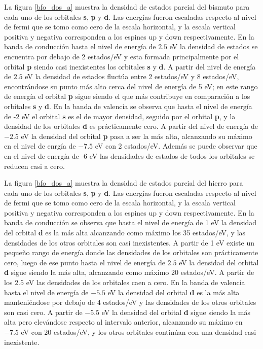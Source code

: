 \noindent La figura \ref{bfo_dos_a}  muestra la densidad de 
estados parcial del 
bismuto 
para cada uno de los orbitales \textbf{s}, \textbf{p} y \textbf{d}. Las 
energ\'ias fueron escaladas respecto al 
nivel de fermi que se tomo como cero de la escala horizontal, y la escala 
vertical positiva y negativa corresponden a los espines up y down 
respectivamente. En la banda 
de conducci\'on hasta el  nivel de energ\'ia de $2.5$ eV la densidad de estados 
se encuentra por debajo de 2 estados/eV y esta formada principalmente 
por el orbital \textbf{p} siendo casi inexistentes los orbitales \textbf{s} y 
\textbf{d}. A partir del nivel de energ\'ia de $2.5$ eV la densidad de estados 
fluct\'ua entre 2 estados/eV y 8 estados/eV, encontr\'andose su punto m\'as 
alto cerca del nivel de energ\'ia de 5 eV; en este rango de energ\'ia el 
orbital \textbf{p} sigue siendo el que m\'as contribuye en comparaci\'on a los 
orbitales \textbf{s} y \textbf{d}. En la banda de valencia se observa que hasta 
el nivel de energ\'ia de -2 eV el orbital \textbf{s} es el de mayor densidad, 
seguido por el orbital \textbf{p}, y la densidad de los orbitales \textbf{d} es 
pr\'acticamente cero. A partir del nivel de energ\'ia de $-2.5$ eV la densidad 
del orbital \textbf{p} pasa a ser la m\'as alta, alcanzando su m\'aximo en el 
nivel de enrg\'ia de $-7.5$ eV con 2 estados/eV. Adem\'as se puede observar que 
en el nivel de energ\'ia de -6 eV las densidades de estados de todos los 
orbitales se reducen casi a cero.


\noindent La figura \ref{bfo_dos_a}  muestra la densidad de 
estados parcial del 
hierro para 
cada uno de los orbitales \textbf{s}, \textbf{p} y \textbf{d}. Las energ\'ias 
fueron escaladas respecto al 
nivel de fermi que se tomo como cero de la escala horizontal, y la escala 
vertical positiva y negativa corresponden a los espines up y down 
respectivamente. En la banda de 
conducci\'on se observa que hasta el nivel de energ\'ia de 1 eV la densidad del 
orbital \textbf{d} es la m\'as alta alcanzando como m\'aximo los 35 estados/eV, 
y las densidades de los otros orbitales son casi inexistentes. A partir de 1 eV 
existe un peque\~no rango de energ\'ia donde las densidades de los orbitales 
son 
pr\'acticamente cero, luego de ese punto hasta el nivel de energ\'ia de $2.5$ 
eV 
la densidad del orbital \textbf{d} sigue siendo la m\'as alta, alcanzando como 
m\'aximo 20 estados/eV. A partir de los $2.5$ eV las densidades de los 
orbitales 
caen a cero. En la banda de valencia hasta el nivel de energ\'ia de $-5.5$ eV 
la 
densidad del orbital \textbf{d} es la m\'as alta manteni\'endose por debajo de 
4 estados/eV y las densidades de los otros orbitales son casi cero. A partir de 
$-5.5$ eV la densidad del orbital \textbf{d} sigue siendo la m\'as alta pero 
elev\'andose respecto al intervalo anterior, alcanzando su m\'aximo en $-7.5$ 
eV 
con 20 estados/eV, y los otros orbitales contin\'uan con una densidad casi 
inexistente.

